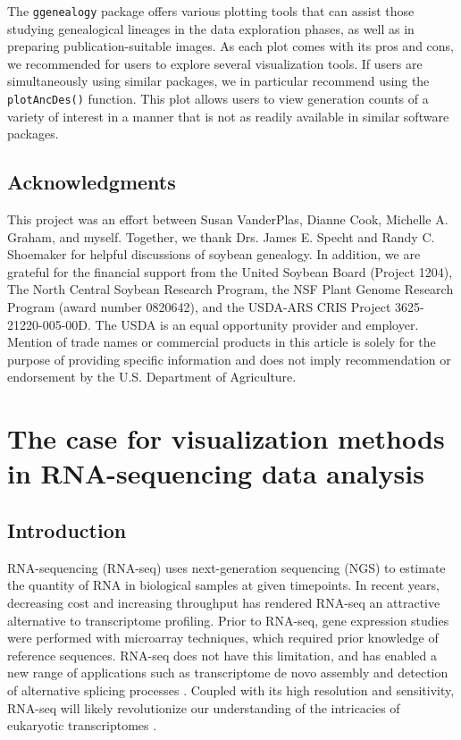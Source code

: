 \documentclass[11pt,a4paper,oldfontcommands,openany]{memoir}
\numberwithin{equation}{section} %
\newcommand{\code}[1]{{\texttt{#1}}}
\newcommand{\pkg}[1]{{\texttt{#1}}}
\begin{document}
The \pkg{ggenealogy} package offers various plotting tools that can assist those studying genealogical lineages in the data exploration phases, as well as in preparing publication-suitable images. As each plot comes with its pros and cons, we recommended for users to explore several visualization tools. If users are simultaneously using similar packages, we in particular recommend using the \code{plotAncDes()} function. This plot allows users to view generation counts of a variety of interest in a manner that is not as readily available in similar software packages.

\section{Acknowledgments}

This project was an effort between Susan VanderPlas, Dianne Cook, Michelle A. Graham, and myself. Together, we  thank Drs. James E. Specht and Randy C. Shoemaker for helpful discussions of soybean genealogy. In addition, we are grateful for the financial support from the United Soybean Board (Project 1204), The North Central Soybean Research Program, the NSF Plant Genome Research Program (award number 0820642), and the USDA-ARS CRIS Project 3625-21220-005-00D. The USDA is an equal opportunity provider and employer. Mention of trade names or commercial products in this article is solely for the purpose of providing specific information and does not imply recommendation or endorsement by the U.S. Department of Agriculture.











\chapter{The case for visualization methods in RNA-sequencing data analysis}
\label{sec:chapter2}

\section{Introduction}

RNA-sequencing (RNA-seq) uses next-generation sequencing (NGS) to estimate the quantity of RNA in biological samples at given timepoints. In recent years, decreasing cost and increasing throughput has rendered RNA-seq an attractive alternative to transcriptome profiling. Prior to RNA-seq, gene expression studies were performed with microarray techniques, which required prior knowledge of reference sequences. RNA-seq does not have this limitation, and has enabled a new range of applications such as transcriptome de novo assembly \citep{Robertson} and detection of alternative splicing processes \citep{Anders2012, Pan}. Coupled with its high resolution and sensitivity, RNA-seq will likely revolutionize our understanding of the intricacies of eukaryotic transcriptomes \citep{Wang, Zhao}.
\end{document}

